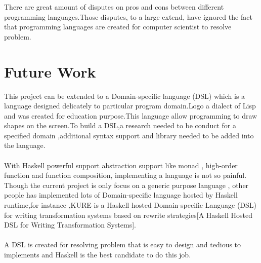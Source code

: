 There are great amount of disputes on pros and cons between different programming languages.Those disputes, to a large extend, have ignored the fact that programming languages are created for computer scientist to resolve problem.




\section{Future Work}
This project can be extended to a Domain-specific language (DSL) which is a language designed delicately to particular program domain.Logo a dialect of Lisp and was created for education purpose.This language allow programming to draw shapes on the screen.To build a DSL,a research needed to be conduct for a specified domain ,additional syntax support and library needed to be added into the language.\\\\
With Haskell powerful support abstraction support like monad , high-order function and function composition, implementing a language is not so painful.
Though the current project is only focus on a generic purpose language , other people has implemented lots of  Domain-specific language hosted by Haskell runtime,for instance ,KURE is a Haskell hosted Domain-specific Language (DSL) for writing transformation systems based on rewrite strategies[A Haskell Hosted DSL for Writing Transformation Systems].\\\\
A DSL is created for resolving problem that is easy to design and tedious to implements and Haskell is the best candidate to do this job.

 